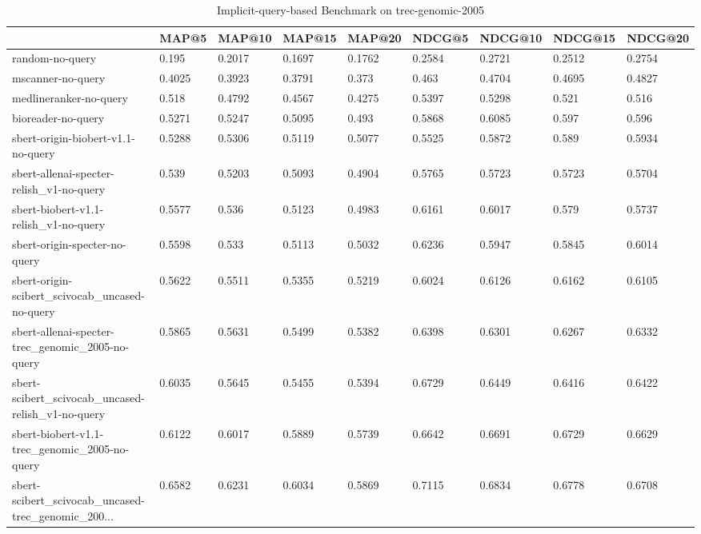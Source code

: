 \begin{table}
\centering
\caption{Implicit-query-based Benchmark on trec-genomic-2005}
\label{tab:noquery-benchmark-trec-genomic-2005}
\begin{tabular}{lllllllll}
\toprule
{} &    MAP@5 &  MAP@10 &  MAP@15 &  MAP@20 &   NDCG@5 & NDCG@10 & NDCG@15 & NDCG@20 \\
\midrule
random-no-query                                    &    0.195 &  0.2017 &  0.1697 &  0.1762 &   0.2584 &  0.2721 &  0.2512 &  0.2754 \\
mscanner-no-query                                  &   0.4025 &  0.3923 &  0.3791 &   0.373 &    0.463 &  0.4704 &  0.4695 &  0.4827 \\
medlineranker-no-query                             &    0.518 &  0.4792 &  0.4567 &  0.4275 &   0.5397 &  0.5298 &   0.521 &   0.516 \\
bioreader-no-query                                 &   0.5271 &  0.5247 &  0.5095 &   0.493 &   0.5868 &  0.6085 &   0.597 &   0.596 \\
sbert-origin-biobert-v1.1-no-query                 &   0.5288 &  0.5306 &  0.5119 &  0.5077 &   0.5525 &  0.5872 &   0.589 &  0.5934 \\
sbert-allenai-specter-relish\_v1-no-query           &    0.539 &  0.5203 &  0.5093 &  0.4904 &   0.5765 &  0.5723 &  0.5723 &  0.5704 \\
sbert-biobert-v1.1-relish\_v1-no-query              &   0.5577 &   0.536 &  0.5123 &  0.4983 &   0.6161 &  0.6017 &   0.579 &  0.5737 \\
sbert-origin-specter-no-query                      &   0.5598 &   0.533 &  0.5113 &  0.5032 &   0.6236 &  0.5947 &  0.5845 &  0.6014 \\
sbert-origin-scibert\_scivocab\_uncased-no-query     &   0.5622 &  0.5511 &  0.5355 &  0.5219 &   0.6024 &  0.6126 &  0.6162 &  0.6105 \\
sbert-allenai-specter-trec\_genomic\_2005-no-query   &   0.5865 &  0.5631 &  0.5499 &  0.5382 &   0.6398 &  0.6301 &  0.6267 &  0.6332 \\
sbert-scibert\_scivocab\_uncased-relish\_v1-no-query  &   0.6035 &  0.5645 &  0.5455 &  0.5394 &   0.6729 &  0.6449 &  0.6416 &  0.6422 \\
sbert-biobert-v1.1-trec\_genomic\_2005-no-query      &   0.6122 &  0.6017 &  0.5889 &  0.5739 &   0.6642 &  0.6691 &  0.6729 &  0.6629 \\
sbert-scibert\_scivocab\_uncased-trec\_genomic\_200... &   0.6582 &  0.6231 &  0.6034 &  0.5869 &   0.7115 &  0.6834 &  0.6778 &  0.6708 \\
\bottomrule
\end{tabular}
\end{table}


